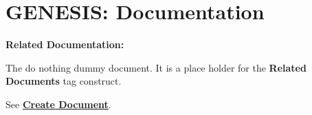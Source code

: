 \documentclass[12pt]{article}
\begin{document}
\section*{GENESIS: Documentation}

{\bf Related Documentation:}

\noindent The do nothing dummy document. It is a place holder for the {\bf Related Documents} tag construct.

See \href{../document-create/dicument-create.tex}{\bf Create Document}.
\end{document}
